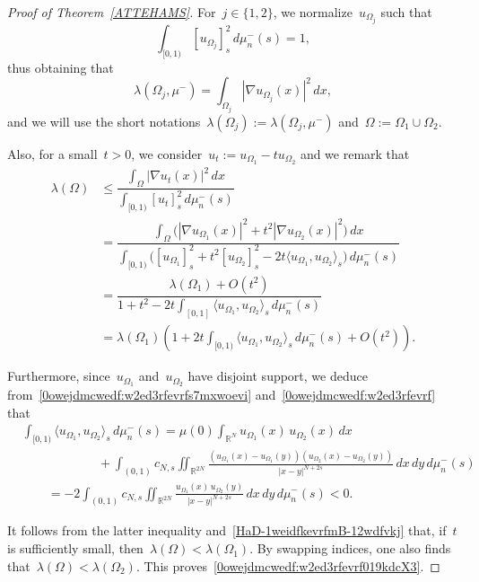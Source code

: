 \documentclass[12pt,a4paper,intlimits,sumlimits]{amsart}
\def \R {\mathbb{R}}
\theoremstyle{definition}
\theoremstyle{plain}
\numberwithin{equation}{section}
\renewcommand{\le}{\leqslant}
\begin{document}
\begin{proof}[Proof of Theorem~\ref{ATTEHAMS}]
For~$j\in\{1,2\}$, we normalize~$u_{\Omega_j}$ such that
$$  \int_{[0,1) } [u_{\Omega_j}]^2_s \, d\mu^-_n(s)=1,$$
thus obtaining that
$$\lambda(\Omega_j,\mu^-)= \int_{\Omega_j} |\nabla u_{\Omega_j}(x)|^2\,dx,$$
and we will use the short notations~$\lambda(\Omega_j):=\lambda(\Omega_j,\mu^-)$ and~$\Omega:=\Omega_1\cup\Omega_2$.

Also, for a small~$t>0$, we consider~$u_t:=u_{\Omega_1}-tu_{\Omega_2}$ and we remark that
\begin{equation}\label{HaD-1weidfkevrfmB-12wdfvkj}\begin{split}
\lambda(\Omega)&\le
\dfrac{\displaystyle \int_\Omega |\nabla u_t(x)|^2\,dx}{\displaystyle \int_{[0,1) } [u_t]^2_s \, d\mu^-_n(s)}\\&=\dfrac{\displaystyle \int_\Omega \Big(|\nabla u_{\Omega_1}(x)|^2+t^2|\nabla u_{\Omega_2}(x)|^2\Big)\,dx}{\displaystyle \int_{[0,1) }\Big( [u_{\Omega_1}]^2_s+t^2
 [u_{\Omega_2}]^2_s-2t\langle u_{\Omega_1},u_{\Omega_2}\rangle_s\Big) \, d\mu^-_n(s)}\\&=\dfrac{\lambda(\Omega_1)+O(t^2)}{1+t^2-2t\displaystyle \int_{[0,1] }\langle u_{\Omega_1},u_{\Omega_2}\rangle_s \, d\mu^-_n(s)}\\&=\lambda(\Omega_1)\left(1+2t
\int_{[0,1) }\langle u_{\Omega_1},u_{\Omega_2}\rangle_s \, d\mu^-_n(s)+O(t^2)\right).
\end{split}\end{equation}

Furthermore, since~$u_{\Omega_1}$ and~$u_{\Omega_2}$ have disjoint support,
we deduce from~\eqref{0owejdmcwedf:w2ed3rfevrfs7mxwoevi}
and~\eqref{0owejdmcwedf:w2ed3rfevrf} that
\begin{equation}\label{0eif0r94-0nc-1-n95hg20nrhguov}\begin{split}
&\int_{[0,1) }\langle u_{\Omega_1},u_{\Omega_2}\rangle_s \, d\mu^-_n(s)=
\mu(0)\int_{\R^N}u_{\Omega_1}(x)\,u_{\Omega_2}(x)\,dx\\& \qquad\qquad\qquad+
\int_{(0,1) } 
c_{N,s}\iint_{\R^{2N}}\frac{(u_{\Omega_1}(x)-u_{\Omega_1}(y))(u_{\Omega_2}(x)-u_{\Omega_2}(y))}{|x-y|^{N+2s}}\,dx\,dy
\, d\mu^-_n(s)\\&\qquad=-2\int_{(0,1) } 
c_{N,s}\iint_{\R^{2N}}\frac{u_{\Omega_1}(x)\,u_{\Omega_2}(y)}{|x-y|^{N+2s}}\,dx\,dy
\, d\mu^-_n(s)<0.\end{split}
\end{equation}

It follows from the latter inequality and~\eqref{HaD-1weidfkevrfmB-12wdfvkj} that,
if~$t$ is sufficiently small, then~$\lambda(\Omega)<\lambda(\Omega_1)$. By swapping indices,
one also finds that~$\lambda(\Omega)<\lambda(\Omega_2)$.
This proves~\eqref{0owejdmcwedf:w2ed3rfevrf019kdcX3}.


\end{proof}
\end{document}
